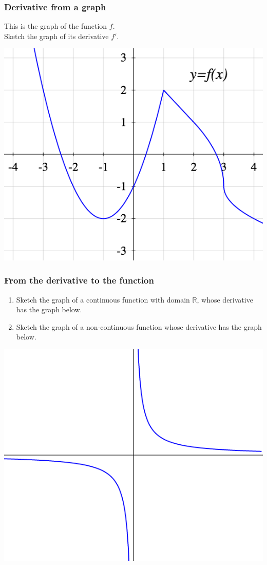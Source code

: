 \documentclass[14pt]{beamer}
\begin{document}
\begin{frame}[t]
	\frametitle{Derivative from a graph}
	This is the graph of the function $f$. \\ Sketch the graph of its derivative
	$f'$.
	\begin{center}
		\includegraphics[scale=.4]{G4}
	\end{center}
\end{frame}

\begin{frame}[t]
	\frametitle{From the derivative to the function}

	\begin{enumerate}
		\item Sketch the graph of a continuous function with domain $\mathbb{R}$,
			whose derivative has the graph below.

		\item Sketch the graph of a non-continuous function whose derivative has the
			graph below.
	\end{enumerate}

	\begin{center}
		\includegraphics[scale=.3]{G5}
	\end{center}
\end{frame}
\end{document}
